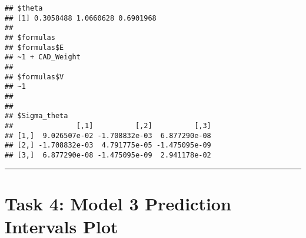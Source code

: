 \documentclass[]{article}
\newenvironment{Shaded}{\begin{snugshade}}{\end{snugshade}}
\newcommand{\KeywordTok}[1]{\textcolor[rgb]{0.13,0.29,0.53}{\textbf{#1}}}
\newcommand{\DataTypeTok}[1]{\textcolor[rgb]{0.13,0.29,0.53}{#1}}
\newcommand{\DecValTok}[1]{\textcolor[rgb]{0.00,0.00,0.81}{#1}}
\newcommand{\StringTok}[1]{\textcolor[rgb]{0.31,0.60,0.02}{#1}}
\newcommand{\OperatorTok}[1]{\textcolor[rgb]{0.81,0.36,0.00}{\textbf{#1}}}
\newcommand{\NormalTok}[1]{#1}
\begin{document}
\begin{Shaded}
\end{Shaded}

\begin{verbatim}
## $theta
## [1] 0.3058488 1.0660628 0.6901968
## 
## $formulas
## $formulas$E
## ~1 + CAD_Weight
## 
## $formulas$V
## ~1
## 
## 
## $Sigma_theta
##               [,1]          [,2]          [,3]
## [1,]  9.026507e-02 -1.708832e-03  6.877290e-08
## [2,] -1.708832e-03  4.791775e-05 -1.475095e-09
## [3,]  6.877290e-08 -1.475095e-09  2.941178e-02
\end{verbatim}

\begin{center}\rule{0.5\linewidth}{\linethickness}\end{center}

\section{Task 4: Model 3 Prediction Intervals
Plot}\label{task-4-model-3-prediction-intervals-plot}
\end{document}
